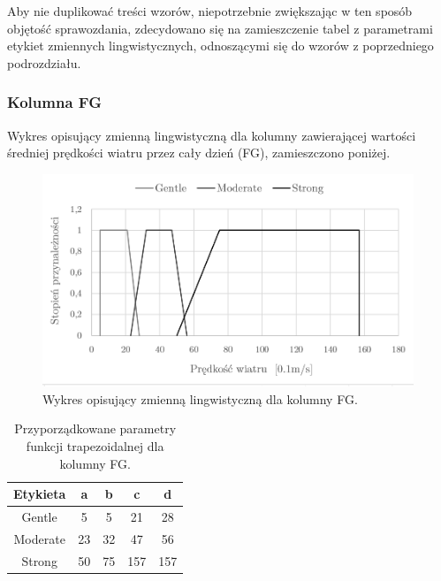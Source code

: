 \documentclass{classrep}
\begin{document}
Aby nie duplikować treści wzorów, niepotrzebnie zwiększając w ten sposób objętość sprawozdania, zdecydowano się na zamieszczenie tabel z parametrami etykiet zmiennych lingwistycznych, odnoszącymi się do wzorów z poprzedniego podrozdziału.

\clearpage



\subsubsection{Kolumna FG}
Wykres opisujący zmienną lingwistyczną dla kolumny zawierającej wartości średniej prędkości wiatru przez cały dzień (FG), zamieszczono poniżej.
\begin{figure}[H]
	\centering
	\includegraphics[width=0.99\textwidth]{Pictures/TermsCharts/FG.png}
	\caption{Wykres opisujący zmienną lingwistyczną dla kolumny FG.}
\end{figure}

\begin{table}[H]
	\centering
	\begin{tabular}{c c c c c} 
		\hline
		\textbf{Etykieta} & \textbf{a} & \textbf{b} & \textbf{c} & \textbf{d}\\ [0.5ex] 
		\hline
		\hline 
Gentle	 & 5 & 5 & 21 & 28 \\
Moderate & 23 & 32 & 47 & 56 \\
Strong	 & 50 & 75 & 157 & 157 \\
		\hline
	\end{tabular}
	\caption{Przyporządkowane parametry funkcji trapezoidalnej dla kolumny FG.}
\end{table}

\clearpage
\end{document}

